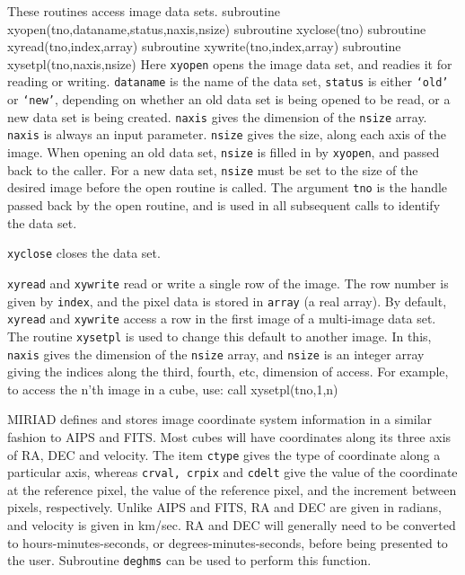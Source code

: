 %
%

These routines access image data sets.
{\ninepoint\begintt
      subroutine xyopen(tno,dataname,status,naxis,nsize)
      subroutine xyclose(tno)
      subroutine xyread(tno,index,array)
      subroutine xywrite(tno,index,array)
      subroutine xysetpl(tno,naxis,nsize)
\endtt}
Here {\tt xyopen} opens the image data set, and readies it for reading or
writing. {\tt dataname} is the name of the data set, {\tt status} is either
{\tt `old'} or {\tt `new'}, depending on whether an old data set is being opened
to be read, or a new data set is being created. {\tt naxis} gives the dimension
of the {\tt nsize} array. {\tt naxis} is always an input parameter.
{\tt nsize} gives the size, along each axis of the
image. When opening an old data set, {\tt nsize} is filled in by {\tt xyopen},
and passed back to the caller. For a new data set, {\tt nsize} must be set
to the
size of the desired image before the open routine is called. The argument
{\tt tno} is the handle passed back by the open routine, and is used
in all subsequent calls to identify the data set.

{\tt xyclose} closes the data set.

{\tt xyread} and {\tt xywrite} read or write a single row of the image. 
The row number is given by {\tt index}, and the pixel data is stored in
{\tt array} (a real array). By default, {\tt xyread} and {\tt xywrite} access
a row in the first image of a multi-image data set. The routine {\tt xysetpl}
is used to change this default to another image. In this, {\tt naxis} gives the
dimension of the {\tt nsize} array, and {\tt nsize} is an integer array
giving the indices along the third, fourth, etc, dimension of access. For
example, to access the n'th image in a cube, use:
{\ninepoint\begintt
      call xysetpl(tno,1,n)
\endtt}


MIRIAD defines and stores image coordinate system information in a similar
fashion to AIPS and FITS. Most cubes will have coordinates along its three
axis of RA, DEC and velocity. The item {\tt ctype} gives the
type of coordinate along a particular axis, whereas {\tt crval, crpix} and
{\tt cdelt} give the value of the coordinate at the reference pixel, the
value of the reference pixel, and the increment between pixels, respectively.
Unlike AIPS and FITS, RA and DEC are given in radians, and velocity is given
in km/sec. RA and DEC will generally need to be converted to
hours-minutes-seconds, or degrees-minutes-seconds, before being presented
to the user.  Subroutine {\tt deghms} can be used to perform this function.


